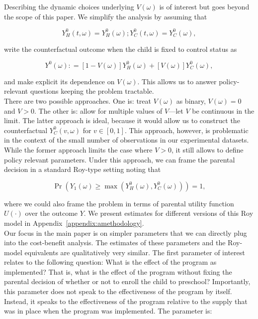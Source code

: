 \noindent Describing the dynamic choices underlying $V \left ( \omega \right)$ is of interest but goes beyond the scope of this paper. We simplify the analysis by assuming that 

\begin{equation}
Y_H^0 \left( t, \omega \right) = Y_H^0 \left( \omega \right); Y_C^0 \left( t, \omega \right) = Y_C^0 \left( \omega \right),
\end{equation}

\noindent write the counterfactual outcome when the child is fixed to control status as 

\begin{equation}
Y^0 \left( \omega \right) : = \left[ 1 - V \left( \omega \right) \right] Y_H^0 \left( \omega \right) + \left[ V \left( \omega \right) \right] Y_C^0 \left( \omega \right), 
\end{equation}

\noindent and make explicit its dependence on $V \left( \omega \right)$. This allows us to answer policy-relevant questions keeping the problem tractable.\\

\noindent There are two possible approaches. One is: treat $V \left( \omega \right)$ as binary, $V \left( \omega \right) = 0$ and $V > 0$. The other is: allow for multiple values of $V$---let $V$ be continuous in the limit. The latter approach is ideal, because it would allow us to construct the counterfactual $Y_C^0 \left( v,  \omega \right) $ for $v \in [0 , 1]$. This approach, however, is problematic in the context of the small number of observations in our experimental datasets. While the former approach limits the case where $V > 0$, it still allows to define policy relevant parameters. Under this approach, we can frame the parental decision in a standard Roy-type setting noting that 

\begin{equation}
\Pr \left( Y_1 \left( \omega \right) \geq \max \left(  Y_{H}^0 \left( \omega \right) ,  Y_{C}^0 \left( \omega \right)   \right) \right) = 1, \label{eq:noutility}
\end{equation}

\noindent where we could also frame the problem in terms of parental utility function $U \left( \cdot \right) $ over the outcome $Y$. We present estimates for different versions of this Roy model in Appendix~\ref{appendix:amethodology}.\\ 

\noindent Our focus in the main paper is on simpler parameters that we can directly plug into the cost-benefit analysis. The estimates of these parameters and the Roy-model equivalents are qualitatively very similar. The first parameter of interest relates to the following question: What is the effect of the program as implemented? That is, what is the effect of the program without fixing the parental decision of whether or not to enroll the child to preschool? Importantly, this parameter does not speak to the effectiveness of the program by itself. Instead, it speaks to the effectiveness of the program relative to the supply that was in place when the program was implemented. The parameter is: 

